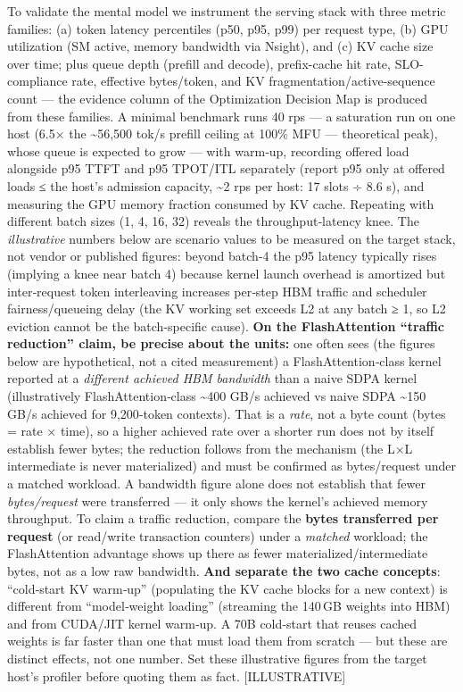 To validate the mental model we instrument the serving stack with three
metric families: (a) token latency percentiles (p50, p95, p99) per
request type, (b) GPU utilization (SM active, memory bandwidth via
Nsight), and (c) KV cache size over time; plus queue depth (prefill and
decode), prefix-cache hit rate, SLO-compliance rate, effective
bytes/token, and KV fragmentation/active-sequence count --- the evidence
column of the Optimization Decision Map is produced from these families.
A minimal benchmark runs 40 rps --- a saturation run on one host (6.5×
the \textasciitilde56,500 tok/s prefill ceiling at 100\% MFU ---
theoretical peak), whose queue is expected to grow --- with warm‑up,
recording offered load alongside p95 TTFT and p95 TPOT/ITL separately
(report p95 only at offered loads ≤ the host's admission capacity,
\textasciitilde2 rps per host: 17 slots ÷ 8.6 s), and measuring the GPU
memory fraction consumed by KV cache. Repeating with different batch
sizes (1, 4, 16, 32) reveals the throughput‑latency knee. The
\emph{illustrative} numbers below are scenario values to be measured on
the target stack, not vendor or published figures: beyond batch‑4 the
p95 latency typically rises (implying a knee near batch 4) because
kernel launch overhead is amortized but inter‑request token interleaving
increases per‑step HBM traffic and scheduler fairness/queueing delay
(the KV working set exceeds L2 at any batch ≥ 1, so L2 eviction cannot
be the batch-specific cause). \textbf{On the FlashAttention ``traffic
reduction'' claim, be precise about the units:} one often sees (the
figures below are hypothetical, not a cited measurement) a
FlashAttention‑class kernel reported at a \emph{different achieved HBM
bandwidth} than a naive SDPA kernel (illustratively FlashAttention‑class
\textasciitilde400 GB/s achieved vs naive SDPA \textasciitilde150\,GB/s
achieved for 9,200‑token contexts). That is a \emph{rate}, not a byte
count (bytes = rate × time), so a higher achieved rate over a shorter
run does not by itself establish fewer bytes; the reduction follows from
the mechanism (the L×L intermediate is never materialized) and must be
confirmed as bytes/request under a matched workload. A bandwidth figure
alone does not establish that fewer \emph{bytes/request} were
transferred --- it only shows the kernel's achieved memory throughput.
To claim a traffic reduction, compare the \textbf{bytes transferred per
request} (or read/write transaction counters) under a \emph{matched}
workload; the FlashAttention advantage shows up there as fewer
materialized/intermediate bytes, not as a low raw bandwidth. \textbf{And
separate the two cache concepts}: ``cold‑start KV warm‑up'' (populating
the KV cache blocks for a new context) is different from ``model‑weight
loading'' (streaming the 140\,GB weights into HBM) and from CUDA/JIT
kernel warm‑up. A 70B cold‑start that reuses cached weights is far
faster than one that must load them from scratch --- but these are
distinct effects, not one number. Set these illustrative figures from
the target host's profiler before quoting them as fact.
\mbox{{[}ILLUSTRATIVE{]}}

